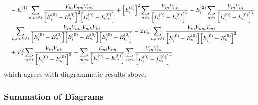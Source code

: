 \documentclass[a4paper]{article}
\numberwithin{equation}{subsection}
\begin{document}
\begin{align}
&{}\quad- E_i^{(1)} \sum_{n,m\neq i} \dfrac{V_{in}V_{nm}V_{mi} }{\qty[E_i^{(0)} - E_n^{(0)}]^2\qty[E_i^{(0)} - E_m^{(0)}]} 
 +  \qty[E_i^{(1)}]^2 \sum_{n\neq i} \dfrac{V_{in}V_{ni}}{\qty[E_i^{(0)} - E_n^{(0)}]^3} 
-  E_i^{(2)} \sum_{n\neq i} \dfrac{V_{in}V_{ni}}{\qty[E_i^{(0)} - E_n^{(0)}]^2} \notag\\
&= \sum_{n,m,k\neq i} \dfrac{V_{in} V_{nm}V_{mk}V_{ki}}{\qty[E_i^{(0)} - E_n^{(0)}]\qty[E_i^{(0)} - E_m^{(0)}]\qty[E_i^{(0)} - E_k^{(0)}]} 
- 2V_{ii}\sum_{n,m\neq i} \dfrac{V_{in} V_{nm} V_{mi}}{\qty[E_i^{(0)} - E_n^{(0)}]\qty[E_i^{(0)} - E_m^{(0)}]^2}  \notag\\
&{}\quad %
+  V_{ii}^2 \sum_{n\neq i} \dfrac{V_{in}V_{ni}}{\qty[E_i^{(0)} - E_n^{(0)}]^3} 
-  \sum_{m\neq i} \dfrac{V_{mi}V_{im}}{\qty[E_i^{(0)} - E_m^{(0)}]} \sum_{n\neq i} \dfrac{V_{in}V_{ni}}{\qty[E_i^{(0)} - E_n^{(0)}]^2} 
\end{align}
which agrees with diagrammatic results above.

\subsubsection{Summation of Diagrams}
\end{document}
